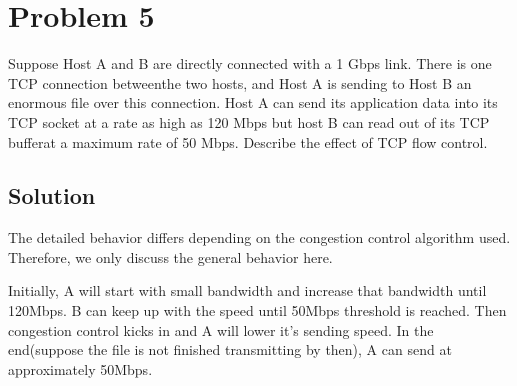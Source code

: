 
\section*{Problem 5}

Suppose Host A and B are directly connected with a 1 Gbps link.
There is one TCP connection betweenthe two hosts, and Host A is sending to Host B an enormous file over this connection.
Host A can send its application data into its TCP socket at a rate as high as 120 Mbps but host B can read out of its TCP bufferat a maximum rate of 50 Mbps.
Describe the effect of TCP flow control.

\subsection*{Solution}

The detailed behavior differs depending on the congestion control algorithm used.
Therefore, we only discuss the general behavior here.

Initially, A will start with small bandwidth and increase that bandwidth until 120Mbps.
B can keep up with the speed until 50Mbps threshold is reached.
Then congestion control kicks in and A will lower it's sending speed.
In the end(suppose the file is not finished transmitting by then), A can send at approximately 50Mbps.